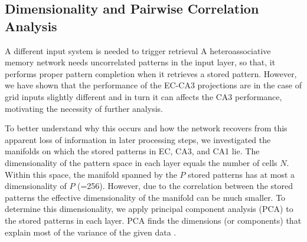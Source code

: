 \documentclass[utf8]{frontiersSCNS} %
\begin{document}
\subsection{Dimensionality and Pairwise Correlation Analysis}

A different input system is needed to trigger retrieval
A heteroassociative memory network needs uncorrelated patterns in the input layer, so that, it performs proper pattern completion when it retrieves a stored pattern.
However, we have shown that the performance of the EC-CA3 projections are in the case of grid inputs slightly different and in turn it can affects the CA3 performance, motivating the necessity of further analysis. 

To better understand why this occurs and how the network recovers from this apparent loss of information in later processing steps, we investigated the manifolds on which the stored patterns in EC, CA3, and CA1 lie. The dimensionality of the pattern space in each layer equals the number of cells $N$. Within this space, the manifold spanned by the $P$ stored patterns has at most a dimensionality of $P$ (=256). However, due to the correlation between the stored patterns the effective dimensionality of the manifold can be much smaller. To determine this dimensionality, we apply principal component analysis (PCA) to the stored patterns in each layer. PCA finds the dimensions (or components) that explain most of the variance of the given data \cite[chapter 4]{Hastie2009}. 
\end{document}
